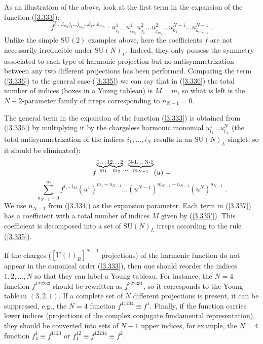 \documentclass[a4paper,12pt]{article}
\begin{document}
As an illustration of the above, look at the first term in the 
expansion of the function (\ref{3.333}): 
\begin{equation}\label{3.336}
  f^{i_1\ldots i_{m_1}j_1\ldots j_{m_2}\ldots k_1\ldots 
k_{m_{N-1}}}\; u^1_{i_1}\ldots u^1_{i_{m_1}}  u^2_{j_1}\ldots 
u^2_{j_{m_2}} \ldots u^{N-1}_{k_1}\ldots u^{N-1}_{k_{m_{N-1}}} \;.
\end{equation}
Unlike the simple $\mbox{SU}(2)$ examples above, here the 
coefficients $f$ are not necessarily irreducible under 
$\mbox{SU}(N)_L$. Indeed, they only possess the symmetry 
associated to each type of harmonic projection but no 
antisymmetrization between any two different projections has been 
performed. Comparing the term (\ref{3.336}) to the general case  
(\ref{3.335}) we can say that in (\ref{3.336}) the total number of 
indices (boxes in a Young tableau) is $M=m$, so what is left is 
the $N-2$-parameter family of irreps corresponding to $n_{N-1}=0$. 

The general term in the expansion of the function (\ref{3.333}) is 
obtained from (\ref{3.336}) by multiplying it by the chargeless 
harmonic monomial $u^1_{i_1}\ldots u^N_{i_N}$ (the total 
antisymmetrization of the indices $i_1,\ldots,i_N$ results in an 
$\mbox{SU}(N)_L$ singlet, so it should be eliminated):
$$
f^{\stackrel{\underbrace{\mbox{\scriptsize 1\ldots 1}}}{m_1} 
\stackrel{\underbrace{\mbox{\scriptsize 2\ldots 2}}}{m_2}\cdots 
\stackrel{\underbrace{\mbox{\scriptsize N-1\ldots 
N-1}}}{m_{N-1}}}(u) = 
$$ 
\begin{equation}\label{3.337}
  \sum^\infty_{n_{N-1}=0} f^{i_1\ldots i_M}(u^1)^{m_1+n_{N-1}}\ldots 
(u^{N-1})^{m_{N-1}+n_{N-1}}(u^{N})^{n_{N-1}}\;. 
\end{equation}
We use $n_{N-1}$ from (\ref{3.334}) as the expansion parameter. 
Each term in (\ref{3.337}) has a coefficient with a total number 
of indices $M$ given by (\ref{3.335'}). This coefficient is 
decomposed into a set of $\mbox{SU}(N)_L$ irreps according to the 
rule (\ref{3.335}). 

If the charges ($[\mbox{U}(1)_R]^{N-1}$ projections) of the 
harmonic function do not appear in the canonical order 
(\ref{3.333}), then one should reorder the indices $1,2,\ldots,N$ 
so that they can label a Young tableau. For instance, the $N=4$ 
function $f^{122233}$ should be rewritten as $f^{222331}$, so it 
corresponds to the Young tableau $(3,2,1)$. If a complete set of  
$N$ different projections is present, it can be suppressed, e.g., 
the $N=4$ function $f^{11234}\equiv f^1$. Finally, if the function 
carries lower indices (projections of the complex conjugate 
fundamental representation), they should be converted into sets of 
$N-1$ upper indices, for example,  the $N=4$ function $f^1_4\equiv 
f^{1123}$ or $f^{12}_1\equiv f^{12234}\equiv f^2$.   
 
\end{document}
